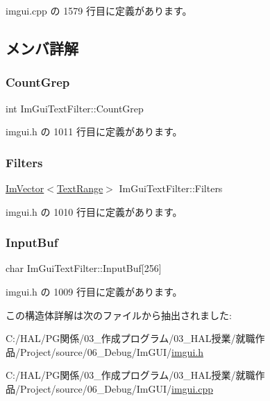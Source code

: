  imgui.\+cpp の 1579 行目に定義があります。



\subsection{メンバ詳解}
\mbox{\label{struct_im_gui_text_filter_ac31839c319fe4211c21fc143b7249f86}} 
\subsubsection{\texorpdfstring{Count\+Grep}{CountGrep}}
{\footnotesize\ttfamily int Im\+Gui\+Text\+Filter\+::\+Count\+Grep}



 imgui.\+h の 1011 行目に定義があります。

\mbox{\label{struct_im_gui_text_filter_a5a930a339a9384e6bfadfa56a7c111fd}} 
\subsubsection{\texorpdfstring{Filters}{Filters}}
{\footnotesize\ttfamily \mbox{\hyperlink{class_im_vector}{Im\+Vector}}$<$\mbox{\hyperlink{struct_im_gui_text_filter_1_1_text_range}{Text\+Range}}$>$ Im\+Gui\+Text\+Filter\+::\+Filters}



 imgui.\+h の 1010 行目に定義があります。

\mbox{\label{struct_im_gui_text_filter_ad070acb1038199dd4e8f5d010c5cb5ba}} 
\subsubsection{\texorpdfstring{Input\+Buf}{InputBuf}}
{\footnotesize\ttfamily char Im\+Gui\+Text\+Filter\+::\+Input\+Buf\mbox{[}256\mbox{]}}



 imgui.\+h の 1009 行目に定義があります。



この構造体詳解は次のファイルから抽出されました\+:\begin{DoxyCompactItemize}
\item 
C\+:/\+H\+A\+L/\+P\+G関係/03\+\_\+作成プログラム/03\+\_\+\+H\+A\+L授業/就職作品/\+Project/source/06\+\_\+\+Debug/\+Im\+G\+U\+I/\mbox{\hyperlink{imgui_8h}{imgui.\+h}}\item 
C\+:/\+H\+A\+L/\+P\+G関係/03\+\_\+作成プログラム/03\+\_\+\+H\+A\+L授業/就職作品/\+Project/source/06\+\_\+\+Debug/\+Im\+G\+U\+I/\mbox{\hyperlink{imgui_8cpp}{imgui.\+cpp}}\end{DoxyCompactItemize}
